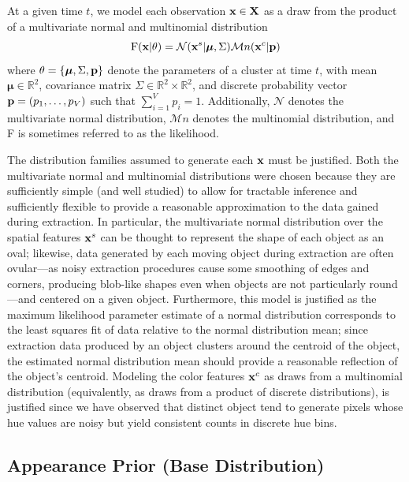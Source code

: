 \documentclass[twocolumn, final]{svjour3}
\begin{document}
At a given time $t$, we model each observation $\bold{x} \in \bold{X}$ as a draw from the product of a multivariate normal and multinomial distribution
\begin{equation}
\label{likelihood}
\text{F}(\bold{x}|\theta) = \mathcal{N}(\bold{x}^{s} | \boldsymbol{\mu}, \Sigma)  \mathcal{M}n(\bold{x}^{c} | \bold{p})
\end{equation}
where $\theta = \{ \boldsymbol{\mu}, \Sigma, \bold{p} \}$ denote the parameters of a cluster at time $t$, with mean $\boldsymbol{\mu} \in \mathbb{R}^{2}$, covariance matrix $\Sigma \in \mathbb{R}^{2} \times \mathbb{R}^{2}$, and discrete probability vector $\bold{p} = (p_{1}, \ldots, p_{V})$ such that $\sum_{i=1}^{V}p_{i} = 1$. Additionally, $\mathcal{N}$ denotes the multivariate normal distribution, $\mathcal{M}n$ denotes the multinomial distribution, and F is sometimes referred to as the likelihood.

The distribution families assumed to generate each $\bold{x}$ must be justified. Both the multivariate normal and multinomial distributions were chosen because they are sufficiently simple (and well studied) to allow for tractable inference and sufficiently flexible to provide a reasonable approximation to the data gained during extraction. In particular, the multivariate normal distribution over the spatial features $\bold{x}^{s}$ can be thought to represent the shape of each object as an oval; likewise, data generated by each moving object during extraction are often ovular---as noisy extraction procedures cause some smoothing of edges and corners, producing blob-like shapes even when objects are not particularly round---and centered on a given object.
Furthermore, this model is justified as the maximum likelihood parameter estimate of a normal distribution corresponds to the least squares fit of data relative to the normal distribution mean; since extraction data produced by an object clusters around the centroid of the object, the estimated normal distribution mean should provide a reasonable reflection of the object's centroid.
Modeling the color features $\bold{x}^{c}$ as draws from a multinomial distribution (equivalently, as draws from a product of discrete distributions), is justified since we have observed that distinct object tend to generate pixels whose hue values are noisy but yield consistent counts in discrete hue bins.


\subsection{Appearance Prior (Base Distribution)}
\label{sec:appearanceprior}
\end{document}
